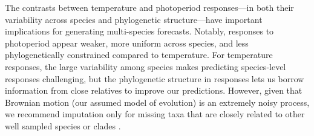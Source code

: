 \documentclass[11pt]{article}
\begin{document}


The contrasts between temperature and photoperiod responses---in both their variability across species and phylogenetic structure---have important implications for generating multi-species forecasts. Notably, responses to photoperiod appear weaker, more uniform across species, and less phylogenetically constrained compared to temperature. For temperature responses, the large variability among species makes predicting species-level  responses challenging, but the phylogenetic structure in responses lets us borrow information from close relatives to improve our predictions. However, given that Brownian motion (our assumed model of evolution) is an extremely noisy process, we recommend imputation only for missing taxa that are closely related to other well sampled species or clades \citep{molina2018assessing,molina2023unreliable}.
\end{document}
